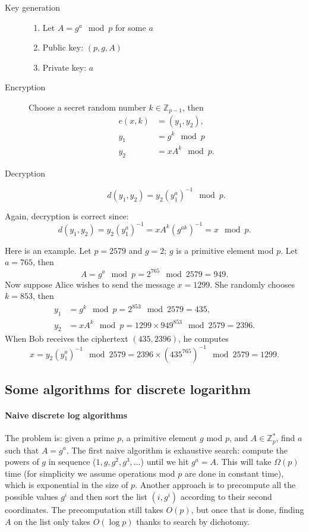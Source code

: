 \documentclass[a4paper, 11pt, openany]{book}
\numberwithin{equation}{section}
\theoremstyle{plain}
\theoremstyle{definition}
\newcommand{\Z}{\mathbb{Z}}
\begin{document}
\begin{description}
\item[Key generation]
    \begin{enumerate}
        \item Let $A = g^a \mod p$ for some $a$
        
        \item Public key: $(p, g, A)$
        
        \item Private key: $a$
    \end{enumerate}

\item[Encryption] Choose a secret random number $k \in \Z_{p-1}$, then
\begin{align*}
    e(x, k) &= (y_1, y_2),\\
    y_1 &= g^k \mod p\\
    y_2 &= x A^k \mod p.
\end{align*}


\item[Decryption]
\[
    d(y_1,y_2) = y_2 (y_1^a)^{-1} \mod p.
\]
\end{description}

Again, decryption is correct since:
\[
    d(y_1, y_2) = y_2 (y_1^a)^{-1} = x A^k (g^{ak})^{-1} = x \mod p.
\]

Here is an example. Let $p = 2579$ and $g = 2$; $g$ is a primitive element mod $p$. Let $a = 765$, then
\[
    A = g^a \mod p = 2^{765} \mod 2579 = 949.
\]
Now suppose Alice wishes to send the message $x = 1299$. She randomly chooses $k = 853$, then
\begin{align*}
    y_1 &= g^k \mod p = 2^{853} \mod 2579 = 435,\\
    y_2 &= x A^k \mod p = 1299 \times 949^{853} \mod 2579 = 2396.
\end{align*}
When Bob receives the ciphertext $(435, 2396)$, he computes
\[
    x = y_2 ( y_1^a )^{-1} \mod 2579 = 2396 \times ( 435^{765} )^{-1} \mod 2579 = 1299.
\]



\subsection{Some algorithms for discrete logarithm}


\paragraph{Naive discrete log algorithms}
The problem is: given a prime $p$, a primitive element $g$ mod $p$, and $A \in \Z_p^*$, find $a$ such that $A = g^a$. The first naive algorithm is exhaustive search: compute the powers of $g$ in sequence ($1, g, g^2, g^3, \dots$) until we hit $g^a = A$. This will take $\Omega(p)$ time (for simplicity we assume operations mod $p$ are done in constant time), which is exponential in the size of $p$. Another approach is to precompute all the possible values $g^i$ and then sort the list $(i,g^i)$ according to their second coordinates. The precomputation still takes $O(p)$, but once that is done, finding $A$ on the list only takes $O(\log p)$ thanks to search by dichotomy.
\end{document}
